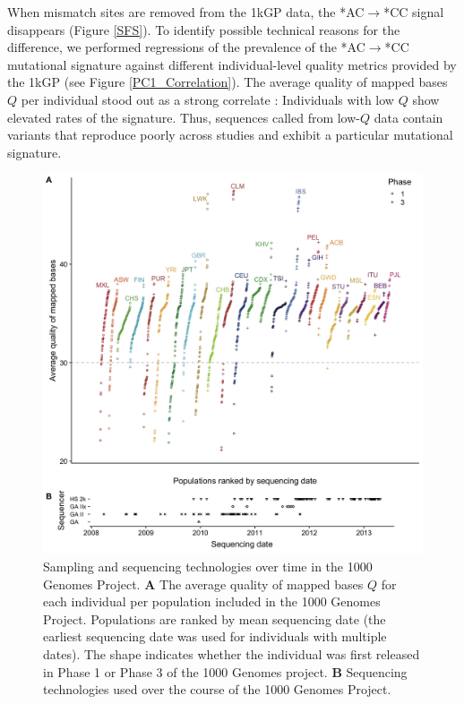 \documentclass[9pt,lineno]{template}
\begin{document}
When mismatch sites are removed from the 1kGP data, the  *AC${\rightarrow}$*CC signal disappears (Figure \ref{SFS}). To identify possible technical reasons for the difference, we performed regressions of the prevalence of the  *AC${\rightarrow}$*CC mutational signature against different individual-level quality metrics provided by the 1kGP (see Figure \ref{PC1_Correlation}). 
The average quality of mapped bases  $Q$ per individual stood out as a strong correlate : Individuals with low $Q$ show elevated rates of the signature. 
Thus, sequences called from low-$Q$ data contain variants that reproduce poorly across studies and exhibit a particular mutational signature. 

\begin{figure}
\includegraphics[width=0.95\hsize,keepaspectratio]{../Figures/MapQualOverTime.jpg}

\caption{Sampling and sequencing technologies over time in the 1000 Genomes Project.
\textbf{A} The average quality of mapped bases $Q$ for each individual per population included in the 1000 Genomes Project. 
 Populations are ranked by mean sequencing date (the earliest sequencing date was used for individuals with multiple dates). 
The shape indicates whether the individual was first released in Phase 1 or Phase 3 of the 1000 Genomes project. 
\textbf{B} Sequencing technologies used over the course of the 1000 Genomes Project.}
\label{MapQual}
\end{figure}
\end{document}
